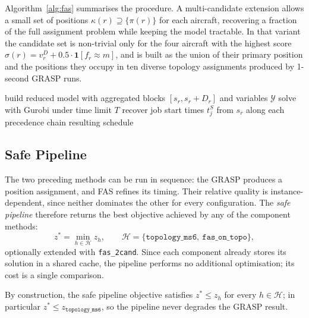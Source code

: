 Algorithm~\ref{alg:fas} summarises the procedure.  A multi-candidate
extension allows a small set of positions $\kappa(r) \supseteq \{\pi(r)\}$
for each aircraft, recovering a fraction of the full assignment problem
while keeping the model tractable.  In that variant the candidate set is
non-trivial only for the four aircraft with the highest score
$\sigma(r) = v^D_r + 0.5 \cdot \mathbf{1}[f_r \approx m]$, and is built as
the union of their primary position and the positions they occupy in
ten diverse topology assignments produced by 1-second GRASP runs.

\begin{algorithm}[htbp]
\DontPrintSemicolon
{}
build reduced model with aggregated blocks $[s_r, s_r + D_r]$
       and variables $\mathcal{Y}$\;
solve with Gurobi under time limit $T$\;
recover job start times $t^S_j$ from $s_r$ along each precedence chain\;
\Return resulting schedule\;
\caption{Fixed-Assignment Scheduler (FAS) with optional multi-candidate.}
\label{alg:fas}
\end{algorithm}

\subsection{Safe Pipeline}
\label{sec:safe_pipeline}

The two preceding methods can be run in sequence: the GRASP produces a
position assignment, and FAS refines its timing.  Their relative quality
is instance-dependent, since neither dominates the other for every
configuration.  The \emph{safe pipeline} therefore returns the best
objective achieved by any of the component methods:
\[
  z^* = \min_{h \in \mathcal{H}} z_h,
  \qquad \mathcal{H} = \{\texttt{topology\_ms6},\ \texttt{fas\_on\_topo}\},
\]
optionally extended with \texttt{fas\_2cand}.  Since each component
already stores its solution in a shared cache, the pipeline performs no
additional optimisation; its cost is a single comparison.

By construction, the safe pipeline objective satisfies $z^* \le z_h$ for
every $h \in \mathcal{H}$; in particular
$z^* \le z_{\texttt{topology\_ms6}}$, so the pipeline never degrades the
GRASP result.
